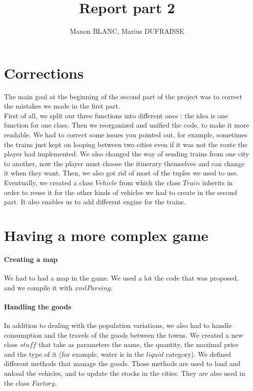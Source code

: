 \documentclass[a4paper]{article}
\title{Report part 2}
\author{Manon BLANC, Marius DUFRAISSE}
\date{  }
\begin{document}
	\maketitle
	\thispagestyle{fancy}
	
	\section{Corrections}
	The main goal at the beginning of the second part of the project was to correct the mistakes we made in the first part.\\
	First of all, we split our three functions into different ones : the idea is one function for one class. Then we reorganized and unified the code, to make it more readable. We had to correct some issues you pointed out, for example, sometimes the trains just kept on looping between two cities even if it was not the route the player had implemented. We also changed the way of sending trains from one city to another, now the player must choose the itinerary themselves and can change it when they want. Then, we also got rid of most of the tuples we used to use. Eventually, we created a class $Vehicle$ from which the class $Train$ inherits in order to reuse it for the other kinds of vehicles we had to create in the second part. It also enables us to add different engine for the trains.
	
	\section{Having a more complex game}
	\paragraph{Creating a map}
	
	We had to had a map in the game. We used a lot the code that was proposed, and we compile it with $xmlParsing$.
	
	\paragraph{Handling the goods}
	
	In addition to dealing with the population variations, we also had to handle consumption and the travels of the goods between the towns. We created a new class $stuff$ that take as parameters the name, the quantity, the maximal price and the type of it (for example, water is in the $liquid$ category). We defined different methods that manage the goods. Those methods are used to load and unload the vehicles, and to update the stocks in the cities. They are also used in the class $Factory$.\\
	
\end{document}
